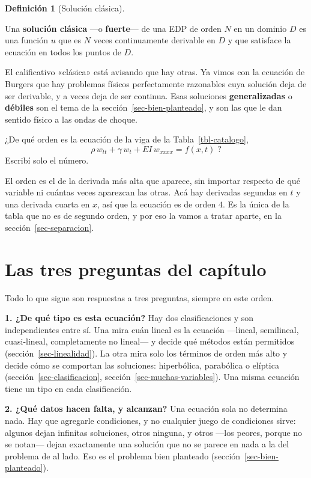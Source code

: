 \documentclass[
  spanish,
  a4paper,
]{scrbook}
\theoremstyle{definition}
\newtheorem{definition}{Definición}[chapter]
\theoremstyle{plain}
\theoremstyle{definition}
\theoremstyle{plain}
\theoremstyle{definition}
\theoremstyle{remark}
\begin{document}
\begin{definition}[Solución
clásica]\protect\hypertarget{def-solucion-clasica}{}\label{def-solucion-clasica}

Una \textbf{solución clásica} ---o \textbf{fuerte}--- de una EDP de
orden \(N\) en un dominio \(D\) es una función \(u\) que es \(N\) veces
continuamente derivable en \(D\) y que satisface la ecuación en todos
los puntos de \(D\).

\end{definition}

El calificativo «clásica» está avisando que hay otras. Ya vimos con la
ecuación de Burgers que hay problemas físicos perfectamente razonables
cuya solución deja de ser derivable, y a veces deja de ser continua.
Esas soluciones \textbf{generalizadas} o \textbf{débiles} son el tema de
la sección~\ref{sec-bien-planteado}, y son las que le dan sentido físico
a las ondas de choque.

¿De qué orden es la ecuación de la viga de la Tabla~\ref{tbl-catalogo},
\[\rho\,w_{tt} + \gamma\,w_t + EI\,w_{xxxx} = f(x,t)\;?\] Escribí solo
el número.

El orden es el de la derivada más alta que aparece, sin importar
respecto de qué variable ni cuántas veces aparezcan las otras. Acá hay
derivadas segundas en \(t\) y una derivada cuarta en \(x\), así que la
ecuación es de orden \(4\). Es la única de la tabla que no es de segundo
orden, y por eso la vamos a tratar aparte, en la
sección~\ref{sec-separacion}.

\section{Las tres preguntas del capítulo}\label{sec-plan}

Todo lo que sigue son respuestas a tres preguntas, siempre en este
orden.

\textbf{1. ¿De qué tipo es esta ecuación?} Hay dos clasificaciones y son
independientes entre sí. Una mira cuán lineal es la ecuación ---lineal,
semilineal, cuasi-lineal, completamente no lineal--- y decide qué
métodos están permitidos (sección~\ref{sec-linealidad}). La otra mira
solo los términos de orden más alto y decide cómo se comportan las
soluciones: hiperbólica, parabólica o elíptica
(sección~\ref{sec-clasificacion}, sección~\ref{sec-muchas-variables}).
Una misma ecuación tiene un tipo en cada clasificación.

\textbf{2. ¿Qué datos hacen falta, y alcanzan?} Una ecuación sola no
determina nada. Hay que agregarle condiciones, y no cualquier juego de
condiciones sirve: algunos dejan infinitas soluciones, otros ninguna, y
otros ---los peores, porque no se notan--- dejan exactamente una
solución que no se parece en nada a la del problema de al lado. Eso es
el problema bien planteado (sección~\ref{sec-bien-planteado}).
\end{document}
